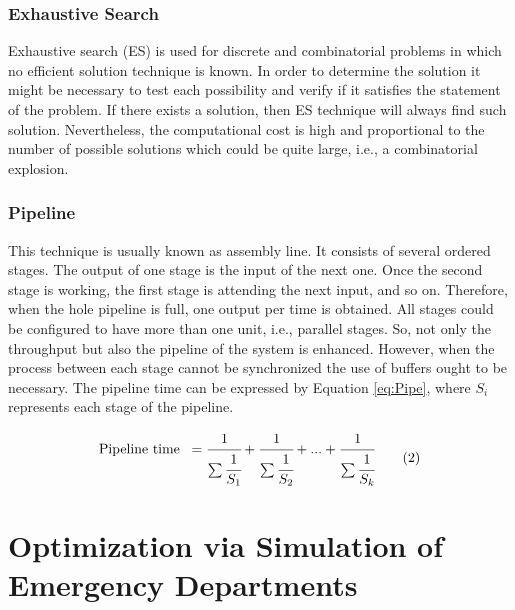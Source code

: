 \documentclass[11pt]{article} %
\begin{document}
\subsubsection{Exhaustive Search}
\label{sssec:exh}

Exhaustive search (ES) is used for discrete and combinatorial problems in which no efficient solution technique is known. In order to determine the solution it might be necessary to test each possibility and verify if it satisfies the statement of the problem. If there exists a solution, then ES technique will always find such solution. Nevertheless, the computational cost is high and proportional to the number of possible solutions which could be quite large, i.e., a combinatorial explosion. 

\subsubsection{Pipeline}
\label{sssec:pipe}

This technique is usually known as assembly line. It consists of several ordered stages. The output of one stage is the input of the next one. Once the second stage is working, the first stage is attending the next input, and so on. Therefore, when the hole pipeline is full, one output per time is obtained. All stages could be configured to have more than one unit, i.e., parallel stages. So, not only the throughput but also the pipeline of the system is enhanced. However, when the process between each stage cannot be synchronized the use of buffers ought to be necessary. The pipeline time can be expressed by Equation  \eqref{eq:Pipe}, where $ S_i $ represents each stage of the pipeline.

\vspace{-0.05cm}
\begin{equation*}  \label{eq:Pipe}
\vspace{-0.05cm}
\begin{aligned}
& {\text{Pipeline time }} \:  = \cfrac{1}{ \sum \cfrac{1}{S_1} } + \cfrac{1}{ \sum \cfrac{1}{S_2} } + ... + \cfrac{1}{ \sum \cfrac{1}{S_k} }  \\
\end{aligned}
\tag{2}
\end{equation*}

\section{Optimization via Simulation of Emergency Departments}
\label{sec:optim}
\end{document}
